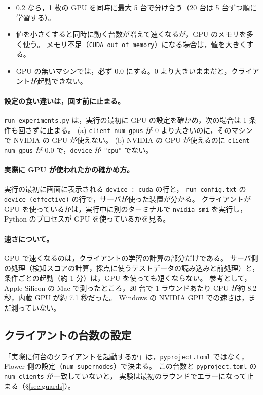 \documentclass[a4j, dvipdfmx]{jsarticle}  %
\begin{document}
\begin{itemize}
  \item 0.2 なら，1 枚の GPU を同時に最大 5 台で分け合う（20 台は 5 台ずつ順に学習する）。
  \item 値を小さくすると同時に動く台数が増えて速くなるが，GPU のメモリを多く使う。
        メモリ不足（\texttt{CUDA out of memory}）になる場合は，値を大きくする。
  \item GPU の無いマシンでは，必ず 0.0 にする。0 より大きいままだと，クライアントが起動できない。
\end{itemize}

\paragraph{設定の食い違いは，回す前に止まる。}
\texttt{run\_experiments.py} は，実行の最初に GPU の設定を確かめ，次の場合は 1 条件も回さずに止まる。
(a) \texttt{client-num-gpus} が 0 より大きいのに，そのマシンで NVIDIA の GPU が使えない。
(b) NVIDIA の GPU が使えるのに \texttt{client-num-gpus} が 0.0 で，\texttt{device} が \texttt{"cpu"} でない。

\paragraph{実際に GPU が使われたかの確かめ方。}
実行の最初に画面に表示される \texttt{device : cuda} の行と，
\texttt{run\_config.txt} の \texttt{device (effective)} の行で，サーバが使った装置が分かる。
クライアントが GPU を使っているかは，実行中に別のターミナルで \texttt{nvidia-smi} を実行し，
Python のプロセスが GPU を使っているかを見る。

\paragraph{速さについて。}
GPU で速くなるのは，クライアントの学習の計算の部分だけである。
サーバ側の処理（検知スコアの計算，採点に使うテストデータの読み込みと前処理）と，条件ごとの起動（約 1 分）は，GPU を使っても短くならない。
参考として，Apple Silicon の Mac で測ったところ，20 台で 1 ラウンドあたり CPU が約 8.2 秒，内蔵 GPU が約 7.1 秒だった。
Windows の NVIDIA GPU での速さは，まだ測っていない。

\subsection{クライアントの台数の設定}

「実際に何台のクライアントを起動するか」は，\texttt{pyproject.toml} ではなく，Flower 側の設定（\texttt{num-supernodes}）で決まる。
この台数と \texttt{pyproject.toml} の \texttt{num-clients} が一致していないと，
実験は最初のラウンドでエラーになって止まる（\S\ref{sec:guards}）。
\end{document}
